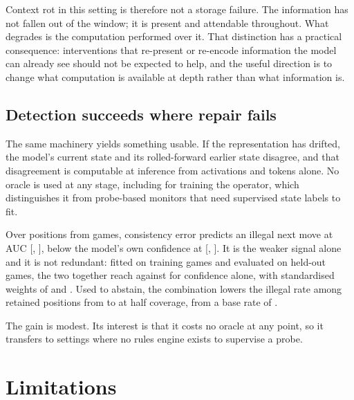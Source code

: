 \documentclass[11pt]{article}
\begin{document}
Context rot in this setting is therefore not a storage failure. The information
has not fallen out of the window; it is present and attendable throughout. What
degrades is the computation performed over it. That distinction has a practical
consequence: interventions that re-present or re-encode information the model can
already see should not be expected to help, and the useful direction is to change
what computation is available at depth rather than what information is.

\subsection{Detection succeeds where repair fails}



The same machinery yields something usable. If the representation has drifted,
the model's current state and its rolled-forward earlier state disagree, and that
disagreement is computable at inference from activations and tokens alone. No
oracle is used at any stage, including for training the operator, which
distinguishes it from probe-based monitors that need supervised state labels to
fit.

Over  positions from  games, consistency error
predicts an illegal next move at AUC 
[, ], below the model's own confidence
at  [, ]. It is the
weaker signal alone and it is not redundant: fitted on training games and
evaluated on held-out games, the two together reach  against
 for confidence alone, with standardised weights of
 and . Used to abstain, the combination
lowers the illegal rate among retained positions from  to
 at half coverage, from a base rate of .

The gain is modest. Its interest is that it costs no oracle at any point, so it
transfers to settings where no rules engine exists to supervise a probe.

\section{Limitations}
\end{document}
